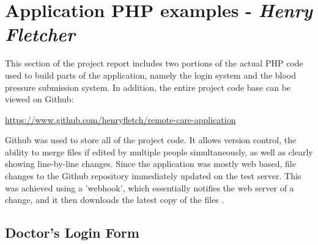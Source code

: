 \documentclass[11pt]{article}
\begin{document}
\section{Application PHP examples - \textit{Henry Fletcher}}
This section of the project report includes two portions of the actual PHP code used to build parts of the application, namely the login system and the blood pressure submission system. In addition, the entire project code base can be viewed on Github:
\begin{framed}
\url{https://www.github.com/henryfletch/remote-care-application}
\end{framed}
Github was used to store all of the project code. It allows version control, the ability to merge files if edited by multiple people simultaneously, as well as clearly showing line-by-line changes. Since the application was mostly web based, file changes to the Github repository immediately updated on the test server. This was achieved using a 'webhook', which essentially notifies the web server of a change, and it then downloads the latest copy of the files \cite{github:webhooks,github:webhook-2}. 

\subsection{Doctor's Login Form} \label{drloginform}

\end{document}
